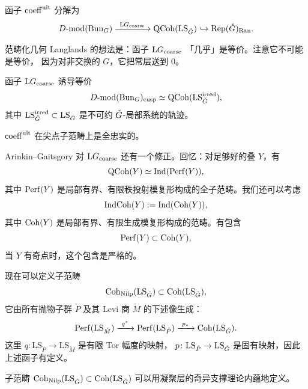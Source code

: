 \begin{corollary}\label{cor:coeff-factors}
函子 \(\operatorname{coeff}^{\mathrm{ult}}\) 分解为
\[
\DMod(\Bun_G)\xrightarrow{\ \LG_{\mathrm{coarse}}\ }\QCoh(\mathrm{LS}_{\Gd})
\hookrightarrow\Rep(\Gd)_{\mathrm{Ran}}.
\]
\end{corollary}

范畴化几何 Langlands 的想法是：函子 \(\mathrm{L}G_{\mathrm{coarse}}\) 「几乎」是等价。注意它不可能是等价，
因为对非交换的 \(G\)，它把常层送到 \(0\)。

\begin{theorem}\label{thm:categorical-1}
函子 \(\mathrm{L}G_{\mathrm{coarse}}\) 诱导等价
\[
D\text{-}\mathrm{mod}(\operatorname{Bun}_G)_{\mathrm{cusp}}\simeq\operatorname{QCoh}(\mathrm{LS}^{\mathrm{irred}}_{\check{G}}),
\]
其中 \(\mathrm{LS}^{\mathrm{irred}}_{\check{G}}\subset\mathrm{LS}_{\check{G}}\) 是不可约 \(\check{G}\)-局部系统的轨迹。
\end{theorem}

\begin{corollary}\label{cor:coeff-ff-cusp}
\(\operatorname{coeff}^{\mathrm{ult}}\) 在尖点子范畴上是全忠实的。
\end{corollary}

Arinkin--Gaitsgory 对 \(\mathrm{L}G_{\mathrm{coarse}}\) 还有一个修正。回忆：对足够好的叠 \(Y\)，有
\[
\operatorname{QCoh}(Y)\simeq\operatorname{Ind}(\operatorname{Perf}(Y)),
\]
其中 \(\operatorname{Perf}(Y)\) 是局部有界、有限秩投射模复形构成的全子范畴。我们还可以考虑
\[
\operatorname{IndCoh}(Y):=\operatorname{Ind}(\operatorname{Coh}(Y)),
\]
其中 \(\operatorname{Coh}(Y)\) 是局部有界、有限生成模复形构成的范畴。有包含
\[
\operatorname{Perf}(Y)\subset\operatorname{Coh}(Y),
\]
当 \(Y\) 有奇点时，这个包含是严格的。

现在可以定义子范畴
\[
\operatorname{Coh}_{\mathrm{Nilp}}(\mathrm{LS}_{\check{G}})\subset\operatorname{Coh}(\mathrm{LS}_{\check{G}}),
\]
它由所有抛物子群 \(\check P\) 及其 Levi 商 \(\check M\) 的下述像生成：
\[
\operatorname{Perf}(\mathrm{LS}_{\check M})\xrightarrow{\ q^* \ }\operatorname{Perf}(\mathrm{LS}_{\check P})
\xrightarrow{\ p_* \ }\operatorname{Coh}(\mathrm{LS}_{\check{G}}).
\]
这里 \(q\colon\mathrm{LS}_{\check P}\to\mathrm{LS}_{\check M}\) 是有限 Tor 幅度的映射，
\(p\colon\mathrm{LS}_{\check P}\to\mathrm{LS}_{\check{G}}\) 是固有映射，因此上述函子有定义。

\begin{remark}\label{rem:cohnilp}
子范畴 \(\operatorname{Coh}_{\mathrm{Nilp}}(\mathrm{LS}_{\check{G}})\subset\operatorname{Coh}(\mathrm{LS}_{\check{G}})\)
可以用凝聚层的奇异支撑理论内蕴地定义。
\end{remark}

